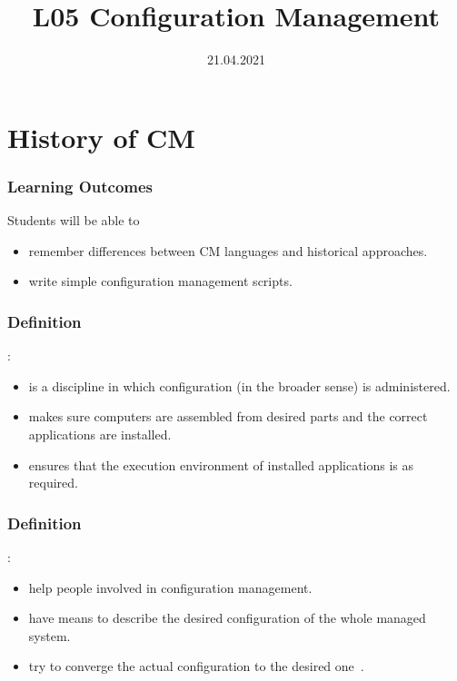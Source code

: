 

\title{L05 Configuration Management}
\date{21.04.2021}




\section{History of CM}

\begin{frame}
	\frametitle{Learning Outcomes}
	Students will be able to
	\begin{itemize}
	\item remember differences between CM languages and historical approaches.
	\item write simple configuration management scripts.
	\end{itemize}
\end{frame}

\begin{frame}
	\frametitle{Definition}

	:

	\begin{itemize}
	\item is a discipline in which configuration (in the broader sense) is administered.
	\item makes sure computers are assembled from desired parts and the correct applications are installed.
	\item ensures that the execution environment of installed applications is as required.
	\end{itemize}
\end{frame}


\begin{frame}
	\frametitle{Definition}

	:

	\pause

	\begin{itemize}
	\item help people involved in configuration management.
	\item have means to describe the desired configuration of the whole managed system.
	\item try to converge the actual configuration to the desired one~\cite{burgess1995cfengine}.
	\end{itemize}
\end{frame}


